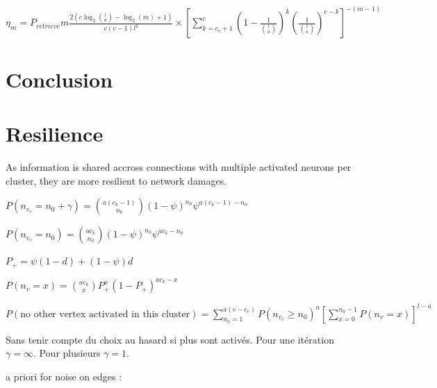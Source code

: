 \documentclass[english,11pt,twocolumn]{article}
\renewcommand{\ge}{\geqslant}
\theoremstyle{definition}
\begin{document}
		$\eta_m = P_{retrieve} m  \frac{2 \left(c \log_2{l \choose a } - \log_2(m) + 1 \right)}{c(c-1)l^2} \times \left [\sum_{k = c_e+1}^{c} \left (1-\frac{1}{{l \choose a}} \right )^k \left (\frac{1}{{l \choose a}} \right )^{c-k} \right ] ^{-(m-1)}$
		
		

	
	
	

	
	\section{Conclusion}	
	
	
	
	
	\section{Resilience}
	
	As information is shared accross connections with multiple activated neurons per cluster, they are more resilient to network damages.

	
	$P(n_{v_c} = n_0 + \gamma ) = {a (c_k-1) \choose n_0} (1-\psi)^{n_0} \psi ^ { a (c_k-1) - n_0 }$	
	
	$P(n_{v_c} = n_0) = {a c_k \choose n_0} (1-\psi)^{n_0} \psi ^ { a c_k - n_0 }$
	
	$P_+ = \psi (1 - d) + (1 - \psi) d$
	
	$P(n_v = x) = {a c_k \choose x} P_+^x (1-P_+)^{a c_k -x }$

	$P(\mbox{no other vertex activated in this cluster})= \sum_{n_0 = 1}^{a (c - c_e)} P(n_{v_c} \ge n_0)^a \left [ \sum_{x = 0}^{n_0 - 1} P(n_v = x) \right]^{l-a}$
	
	
	Sans tenir compte du choix au hasard si plus sont activés. Pour une itération $\gamma = \infty$. Pour plusieurs $\gamma = 1$.
	
		a priori for noise on edges :
\end{document}
